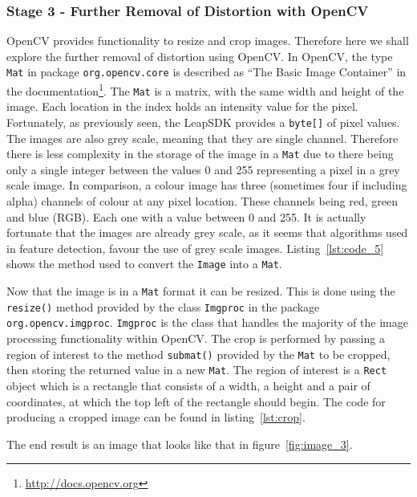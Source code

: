 \documentclass[11pt,oneside]{report}
\newcommand\code[1]{\texttt{#1}}
\begin{document}
		\subsubsection{Stage 3 - Further Removal of Distortion with OpenCV}
		OpenCV provides functionality to resize and crop images.
		Therefore here we shall explore the further removal of distortion using OpenCV.
		In OpenCV, the type \code{Mat} in package \code{org.opencv.core} is described as ``The Basic Image Container'' in the documentation\footnote{\url{http://docs.opencv.org}}.
		The \code{Mat} is a matrix, with the same width and height of the image.
		Each location in the index holds an intensity value for the pixel.
		Fortunately, as previously seen, the LeapSDK provides a \code{byte[]} of pixel values.
		The images are also grey scale, meaning that they are single channel.
		Therefore there is less complexity in the storage of the image in a \code{Mat} due to there being only a single integer between the values 0 and 255 representing a pixel in a grey scale image.
		In comparison, a colour image has three (sometimes four if including alpha) channels of colour at any pixel location.
		These channels being red, green and blue (RGB).
		Each one with a value between 0 and 255.
		It is actually fortunate that the images are already grey scale, as it seems that algorithms used in feature detection, favour the use of grey scale images.
		Listing~\ref{lst:code_5} shows the method used to convert the \code{Image} into a \code{Mat}.
		
		Now that the image is in a \code{Mat} format it can be resized.
		This is done using the \code{resize()} method provided by the class \code{Imgproc} in the package \code{org.opencv.imgproc}.
		\code{Imgproc} is the class that handles the majority of the image processing functionality within OpenCV.
		The crop is performed by passing a region of interest to the method \code{submat()} provided by the \code{Mat} to be cropped, then storing the returned value in a new \code{Mat}.
		The region of interest is a \code{Rect} object which is a rectangle that consists of a width, a height and a pair of coordinates, at which the top left of the rectangle should begin.
		The code for producing a cropped image can be found in listing~\ref{lst:crop}.
		
		The end result is an image that looks like that in figure~\ref{fig:image_3}.
\end{document}
